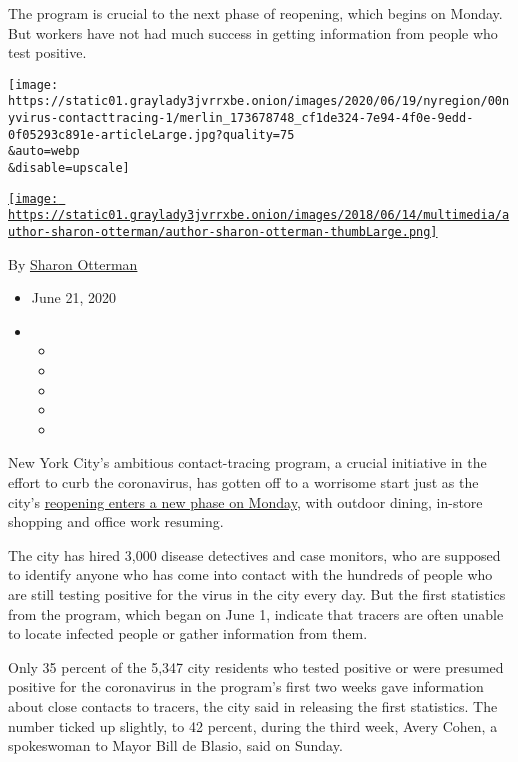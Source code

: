 The program is crucial to the next phase of reopening, which begins on
Monday. But workers have not had much success in getting information
from people who test positive.

\texttt{[image: https://static01.graylady3jvrrxbe.onion/images/2020/06/19/nyregion/00nyvirus-contacttracing-1/merlin\_173678748\_cf1de324-7e94-4f0e-9edd-0f05293c891e-articleLarge.jpg?quality=75\\\&auto=webp\\\&disable=upscale]}

\href{https://www.nytimes3xbfgragh.onion/by/sharon-otterman}{\texttt{[image: https://static01.graylady3jvrrxbe.onion/images/2018/06/14/multimedia/author-sharon-otterman/author-sharon-otterman-thumbLarge.png]}}

By \href{https://www.nytimes3xbfgragh.onion/by/sharon-otterman}{Sharon
Otterman}

\begin{itemize}
\item
  June 21, 2020
\item
  \begin{itemize}
  \item
  \item
  \item
  \item
  \item
  \end{itemize}
\end{itemize}

New York City's ambitious contact-tracing program, a crucial initiative
in the effort to curb the coronavirus, has gotten off to a worrisome
start just as the city's
\href{https://www.nytimes3xbfgragh.onion/2020/06/18/nyregion/phase-2-reopening-nyc.html}{reopening
enters a new phase on Monday}, with outdoor dining, in-store shopping
and office work resuming.

The city has hired 3,000 disease detectives and case monitors, who are
supposed to identify anyone who has come into contact with the hundreds
of people who are still testing positive for the virus in the city every
day. But the first statistics from the program, which began on June 1,
indicate that tracers are often unable to locate infected people or
gather information from them.

Only 35 percent of the 5,347 city residents who tested positive or were
presumed positive for the coronavirus in the program's first two weeks
gave information about close contacts to tracers, the city said in
releasing the first statistics. The number ticked up slightly, to 42
percent, during the third week, Avery Cohen, a spokeswoman to Mayor Bill
de Blasio, said on Sunday.

